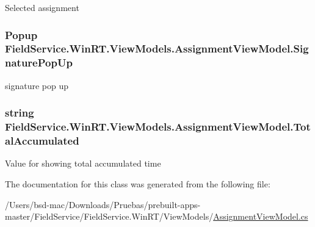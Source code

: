 Selected assignment 

\hypertarget{class_field_service_1_1_win_r_t_1_1_view_models_1_1_assignment_view_model_abba4776d131b7cf0ed4e3ca68c53dc39}{
\subsubsection[{Signature\+Pop\+Up}]{\setlength{\rightskip}{0pt plus 5cm}Popup Field\+Service.\+Win\+R\+T.\+View\+Models.\+Assignment\+View\+Model.\+Signature\+Pop\+Up\hspace{0.3cm}{\ttfamily [get]}}}\label{class_field_service_1_1_win_r_t_1_1_view_models_1_1_assignment_view_model_abba4776d131b7cf0ed4e3ca68c53dc39}


signature pop up 

\hypertarget{class_field_service_1_1_win_r_t_1_1_view_models_1_1_assignment_view_model_a5a5efa41539e88f76bf560fe6c42d44b}{
\subsubsection[{Total\+Accumulated}]{\setlength{\rightskip}{0pt plus 5cm}string Field\+Service.\+Win\+R\+T.\+View\+Models.\+Assignment\+View\+Model.\+Total\+Accumulated\hspace{0.3cm}{\ttfamily [get]}}}\label{class_field_service_1_1_win_r_t_1_1_view_models_1_1_assignment_view_model_a5a5efa41539e88f76bf560fe6c42d44b}


Value for showing total accumulated time 



The documentation for this class was generated from the following file\+:\begin{DoxyCompactItemize}
\item 
/\+Users/bsd-\/mac/\+Downloads/\+Pruebas/prebuilt-\/apps-\/master/\+Field\+Service/\+Field\+Service.\+Win\+R\+T/\+View\+Models/\hyperlink{_win_r_t_2_view_models_2_assignment_view_model_8cs}{Assignment\+View\+Model.\+cs}\end{DoxyCompactItemize}
